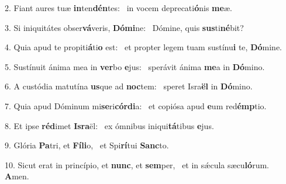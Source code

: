 2. Fiant aures tuæ \textbf{in}ten\textbf{dén}tes: \ast\  in vocem deprecati\textbf{ó}nis \textbf{me}æ.\

3. Si iniquitátes obser\textbf{vá}veris, \textbf{Dó}\textbf{mi}ne: \ast\  Dómine, quis \textbf{sus}ti\textbf{né}bit?\

4. Quia apud te propiti\textbf{á}ti\textbf{o} est: \ast\  et propter legem tuam sustínu\textbf{i} te, \textbf{Dó}mine.\

5. Sustínuit ánima mea in \textbf{ver}bo \textbf{e}jus: \ast\  sperávit ánima \textbf{me}a in \textbf{Dó}mino.\

6. A custódia matutína \textbf{us}que ad \textbf{noc}tem: \ast\  speret Isra\textbf{ël} in \textbf{Dó}mino.\

7. Quia apud Dóminum mi\textbf{se}ri\textbf{cór}\textbf{di}a: \ast\  et copiósa apud \textbf{e}um red\textbf{émp}tio.\

8. Et ipse \textbf{réd}imet \textbf{Is}\textbf{ra}ël: \ast\  ex ómnibus iniqui\textbf{tá}tibus \textbf{e}jus.\

9. Glória \textbf{Pa}tri, et \textbf{Fí}\textbf{li}o, \ast\  et Spi\textbf{rí}tui \textbf{Sanc}to.\

10. Sicut erat in princípio, et \textbf{nunc}, et \textbf{sem}per, \ast\  et in sǽcula sæcu\textbf{ló}rum. \textbf{A}men.\

